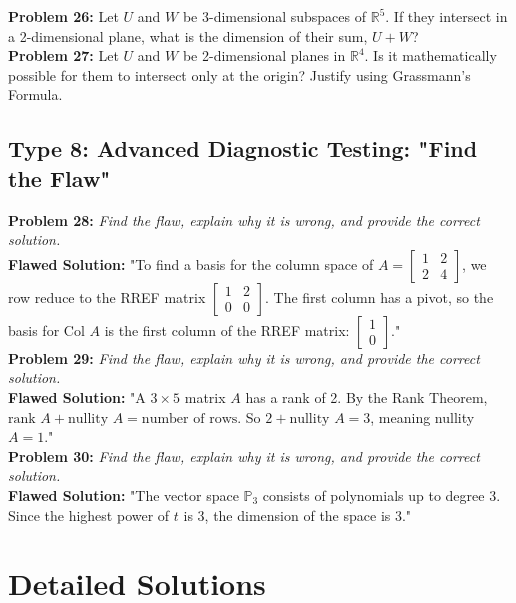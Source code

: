 \documentclass{article}
\begin{document}
\textbf{Problem 26:} Let $U$ and $W$ be 3-dimensional subspaces of $\mathbb{R}^5$. If they intersect in a 2-dimensional plane, what is the dimension of their sum, $U + W$? \\

\textbf{Problem 27:} Let $U$ and $W$ be 2-dimensional planes in $\mathbb{R}^4$. Is it mathematically possible for them to intersect only at the origin? Justify using Grassmann's Formula. \\

\subsection*{Type 8: Advanced Diagnostic Testing: "Find the Flaw"}
\textbf{Problem 28:} \textit{Find the flaw, explain why it is wrong, and provide the correct solution.} \\
\textbf{Flawed Solution:} "To find a basis for the column space of $A = \begin{bmatrix} 1 & 2 \\ 2 & 4 \end{bmatrix}$, we row reduce to the RREF matrix $\begin{bmatrix} 1 & 2 \\ 0 & 0 \end{bmatrix}$. The first column has a pivot, so the basis for Col $A$ is the first column of the RREF matrix: $\begin{bmatrix} 1 \\ 0 \end{bmatrix}$." \\

\textbf{Problem 29:} \textit{Find the flaw, explain why it is wrong, and provide the correct solution.} \\
\textbf{Flawed Solution:} "A $3 \times 5$ matrix $A$ has a rank of 2. By the Rank Theorem, $\text{rank } A + \text{nullity } A = \text{number of rows}$. So $2 + \text{nullity } A = 3$, meaning nullity $A = 1$." \\

\textbf{Problem 30:} \textit{Find the flaw, explain why it is wrong, and provide the correct solution.} \\
\textbf{Flawed Solution:} "The vector space $\mathbb{P}_3$ consists of polynomials up to degree 3. Since the highest power of $t$ is 3, the dimension of the space is 3."

\newpage

\section{Detailed Solutions}
\end{document}
